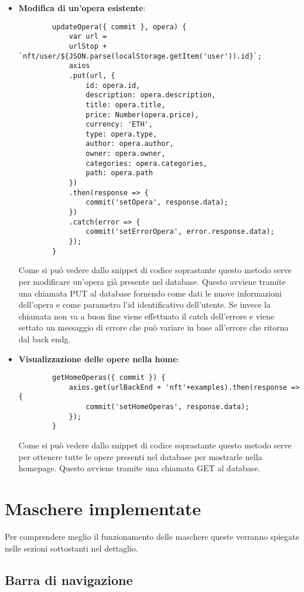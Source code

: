 \begin{itemize}
	\item \textbf{Modifica di un'opera esistente}:
	\begin{lstlisting}
		updateOpera({ commit }, opera) {
			var url =
			urlStop + `nft/user/${JSON.parse(localStorage.getItem('user')).id}`;
			axios
			.put(url, {
				id: opera.id,
				description: opera.description,
				title: opera.title,
				price: Number(opera.price),
				currency: 'ETH',
				type: opera.type,
				author: opera.author,
				owner: opera.owner,
				categories: opera.categories,
				path: opera.path
			})
			.then(response => {
				commit('setOpera', response.data);
			})
			.catch(error => {
				commit('setErrorOpera', error.response.data);
			});
		}
	\end{lstlisting}
	Come si può vedere dallo snippet di codice soprastante questo metodo serve per modificare un'opera già presente nel database. Questo avviene tramite una chiamata PUT al database fornendo come dati le nuove informazioni dell'opera e come parametro l'id identificativo dell'utente. Se invece  la chiamata non va a buon fine viene effettuato il catch dell'errore e viene settato un messaggio di errore che può variare in base all'errore che ritorna dal \gls{back endg}.
	\item \textbf{Visualizzazione delle opere nella home}:
	\begin{lstlisting}
		getHomeOperas({ commit }) {
			axios.get(urlBackEnd + 'nft'+examples).then(response => {
				commit('setHomeOperas', response.data);
			});
		}
	\end{lstlisting}
	Come si può vedere dallo snippet di codice soprastante questo metodo serve per ottenere tutte le opere presenti nel database per mostrarle nella homepage. Questo avviene tramite una chiamata GET al database.
\end{itemize}

\section{Maschere implementate}
\label{sec:maschere-implementate}

Per comprendere meglio il funzionamento delle maschere queste verranno spiegate nelle sezioni sottostanti nel dettaglio.

\subsection{Barra di navigazione}
\label{subsec:barra-navigazione}

